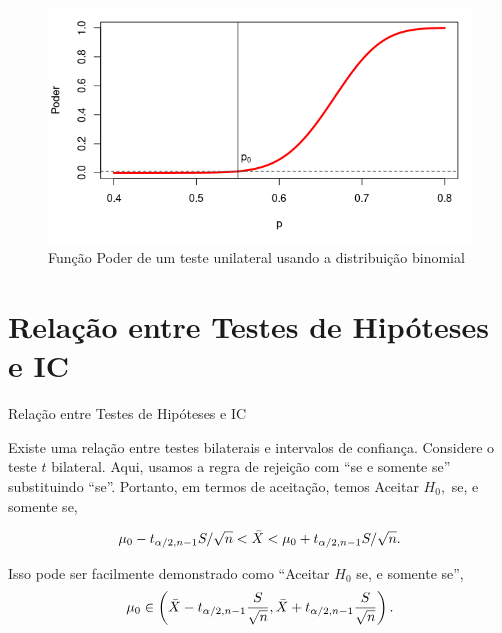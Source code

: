 \documentclass[12pt]{beamer}
\begin{document}
\begin{frame}{}
\begin{block}{}
\justifying
\begin{figure}
    \centering
    \includegraphics[scale=0.7]{figs/binomPower.png}
    \caption{Função Poder de um teste unilateral usando a distribuição binomial}
    \label{fig:enter-label}
\end{figure}
\end{block}
\end{frame}

\section{Relação entre Testes de Hipóteses e IC}
\begin{frame}{Relação entre Testes de Hipóteses e IC}
\begin{block}{}
\justifying
Existe uma relação entre testes bilaterais e intervalos de confiança. Considere o teste $t$ bilateral. Aqui, usamos a regra de rejeição com ``se e somente se'' substituindo ``se''. Portanto, em termos de aceitação, temos Aceitar $H_0,$ se, e somente se,

\begin{align*}
\mu_0 - t_{\alpha/2, n-1}S/\sqrt{n} < \Bar{X} < \mu_0 + t_{\alpha/2, n-1}S/\sqrt{n}.
\end{align*}
\end{block}
\pause
\begin{block}{}
Isso pode ser facilmente demonstrado como ``Aceitar $H_0$ se, e somente se'',
\begin{align*}
\mu_0 \in \left(\Bar{X} - t_{\alpha/2, n-1}\frac{S}{\sqrt{n}}, \Bar{X} + t_{\alpha/2, n-1}\frac{S}{\sqrt{n}}\right).
\end{align*}
\end{block}
\end{frame}
\end{document}
